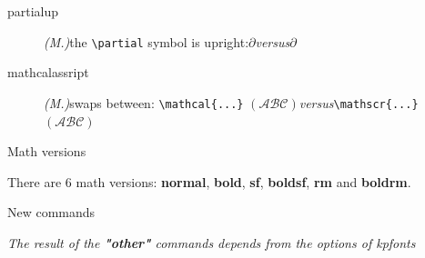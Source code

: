 \documentclass[a4paper,11pt]{article}
\newcommand{\versus}{\;\textit{versus}\;}
\begin{document}
\begin{description}
  \item[partialup]\textit{(M.)}\quad the \verb=\partial= symbol is upright:\quad$\partialup$\versus$\partial$
  \item[mathcalassript]\textit{(M.)}\quad swaps between: 
       \verb=\mathcal{...}= $(\mathcal{ABC})$\versus\verb=\mathscr{...}= $(\mathscr{ABC})$
\end{description}

\vfill

\begin{center}
\textsf{\Large Math versions}
\end{center}

There are 6 math versions: \textbf{normal}, \textbf{bold}, \textbf{sf}, \textbf{boldsf}, \textbf{rm} and \textbf{boldrm}.

\vfill

\begin{center}
\textsf{\Large New commands}
\end{center}

\begin{center}
\textit{\small The result of the \textbf{"other"} commands depends from the options of \textit{kpfonts}}
\end{center}
\end{document}
